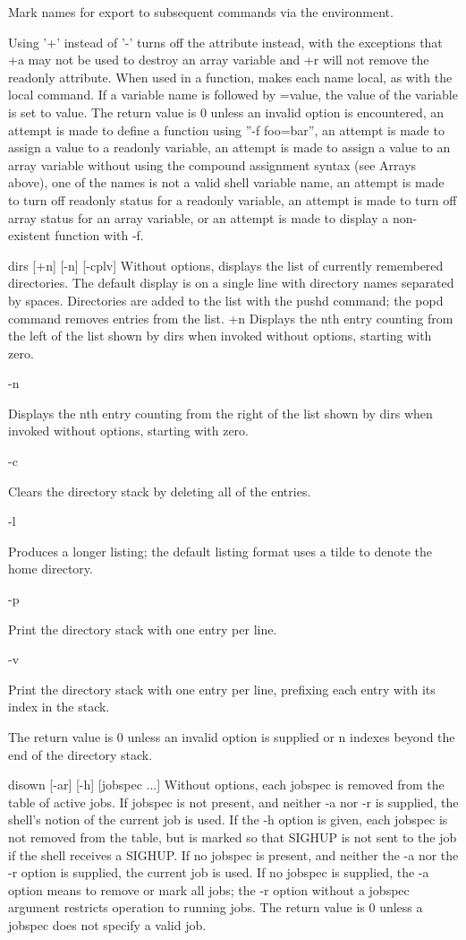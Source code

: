 Mark names for export to subsequent commands via the environment.

Using '+' instead of '-' turns off the attribute instead, with the exceptions that +a may not be used to destroy an array variable and +r will not remove the readonly attribute. When used in a function, makes each name local, as with the local command. If a variable name is followed by =value, the value of the variable is set to value. The return value is 0 unless an invalid option is encountered, an attempt is made to define a function using ''-f foo=bar'', an attempt is made to assign a value to a readonly variable, an attempt is made to assign a value to an array variable without using the compound assignment syntax (see Arrays above), one of the names is not a valid shell variable name, an attempt is made to turn off readonly status for a readonly variable, an attempt is made to turn off array status for an array variable, or an attempt is made to display a non-existent function with -f.

dirs [+n] [-n] [-cplv]
Without options, displays the list of currently remembered directories. The default display is on a single line with directory names separated by spaces. Directories are added to the list with the pushd command; the popd command removes entries from the list.
+n
Displays the nth entry counting from the left of the list shown by dirs when invoked without options, starting with zero.

-n

Displays the nth entry counting from the right of the list shown by dirs when invoked without options, starting with zero.

-c

Clears the directory stack by deleting all of the entries.

-l

Produces a longer listing; the default listing format uses a tilde to denote the home directory.

-p

Print the directory stack with one entry per line.

-v

Print the directory stack with one entry per line, prefixing each entry with its index in the stack.

The return value is 0 unless an invalid option is supplied or n indexes beyond the end of the directory stack.

disown [-ar] [-h] [jobspec ...]
Without options, each jobspec is removed from the table of active jobs. If jobspec is not present, and neither -a nor -r is supplied, the shell's notion of the current job is used. If the -h option is given, each jobspec is not removed from the table, but is marked so that SIGHUP is not sent to the job if the shell receives a SIGHUP. If no jobspec is present, and neither the -a nor the -r option is supplied, the current job is used. If no jobspec is supplied, the -a option means to remove or mark all jobs; the -r option without a jobspec argument restricts operation to running jobs. The return value is 0 unless a jobspec does not specify a valid job.

